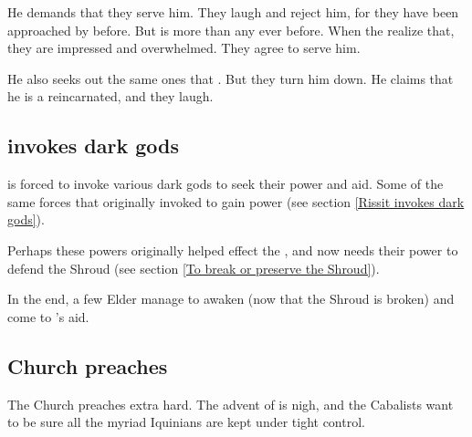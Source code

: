 He demands that they serve him. They laugh and reject him, for they have been approached by \dragons{} before. But \Vizsherioch{} is more \xzaishann{} than any \dragon{} ever before. When the \daemons{} realize that, they are impressed and overwhelmed. They agree to serve him. 

He also seeks out \dash the same ones that . But they turn him down. He claims that he is a \xzaishann{} reincarnated, and they laugh.








\subsection{\Ishnaruchaefir invokes dark gods}
\Ishnaruchaefir{} is forced to invoke various dark gods to seek their power and aid. Some of the same forces that \Secherdamon{} originally invoked to gain power (see section \ref{Rissit invokes dark gods}). 

Perhaps these powers originally helped effect the , and now \Ishnaruchaefir{} needs their power to defend the Shroud (see section \ref{To break or preserve the Shroud}).

In the end, a few Elder \Dragons manage to awaken (now that the Shroud is broken) and come to \Ishnaruchaefir's aid.









\subsection{\Iquinian Church preaches}
The \Iquinian Church preaches extra hard. 
The advent of \Lithrim{} is nigh, and the Cabalists want to be sure all the myriad Iquinians are kept under tight control. 

